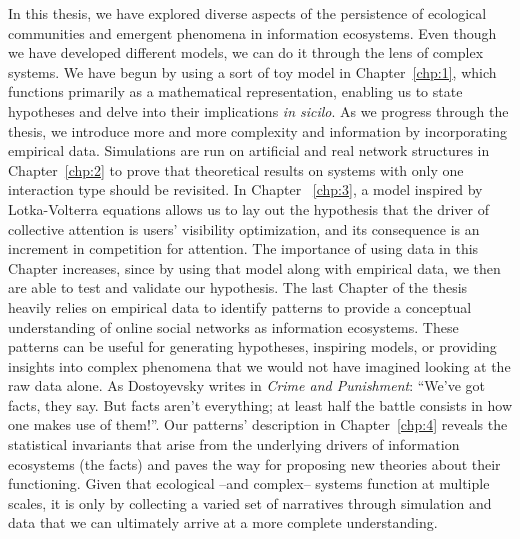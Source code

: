 In this thesis, we have explored diverse aspects of the persistence of ecological communities and emergent phenomena in information ecosystems. Even though we have developed different models, we can do it through the lens of complex systems. We have begun by using a sort of toy model in Chapter~\ref{chp:1}, which functions primarily as a mathematical representation, enabling us to state hypotheses and delve into their implications \textit{in sicilo}. As we progress through the thesis, we introduce more and more complexity and information by incorporating empirical data. Simulations are run on artificial and real network structures in Chapter~\ref{chp:2} to prove that theoretical results on systems with only one interaction type should be revisited. In Chapter ~\ref{chp:3}, a model inspired by Lotka-Volterra equations allows us to lay out the hypothesis that the driver of collective attention is users' visibility optimization, and its consequence is an increment in competition for attention. The importance of using data in this Chapter increases, since by using that model along with empirical data, we then are able to test and validate our hypothesis. The last Chapter of the thesis heavily relies on empirical data to identify patterns to provide a conceptual understanding of online social networks as information ecosystems. These patterns can be useful for generating hypotheses, inspiring models, or providing insights into complex phenomena that we would not have imagined looking at the raw data alone. As Dostoyevsky writes in \textit{Crime and Punishment}: ``We’ve got facts, they say. But facts aren’t everything; at least half the battle consists in how one makes use of them!''. Our patterns' description in Chapter~\ref{chp:4} reveals the statistical invariants that arise from the underlying drivers of information ecosystems (the facts) and paves the way for proposing new theories about their functioning. Given that ecological --and complex-- systems function at multiple scales, it is only by collecting a varied set of narratives through simulation and data that we can ultimately arrive at a more complete understanding.\\

